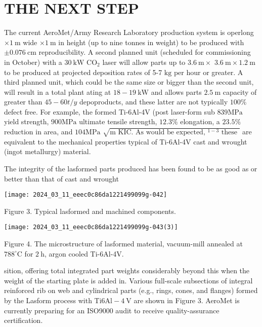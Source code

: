 \documentclass[10pt]{article}
\begin{document}
\section*{THE NEXT STEP}
The current AeroMet/Army Research Laboratory production system is operlong $\times 1 \mathrm{~m}$ wide $\times 1 \mathrm{~m}$ in height (up to nine tonnes in weight) to be produced with $\pm 0.076 \mathrm{~cm}$ reproducibility. A second planned unit (scheduled for commissioning in October) with a $30 \mathrm{~kW}$ $\mathrm{CO}_{2}$ laser will allow parts up to $3.6 \mathrm{~m} \times$ $3.6 \mathrm{~m} \times 1.2 \mathrm{~m}$ to be produced at projected deposition rates of 5-7 $\mathrm{kg}$ per hour or greater. A third planned unit, which could be the same size or bigger than the second unit, will result in a total plant ating at $18-19 \mathrm{~kW}$ and allows parts $2.5 \mathrm{~m}$ capacity of greater than $45-60 t / y$ depoproducts, and these latter are not typically $100 \%$ defect free. For example, the formed Ti-6Al-4V (post laser-form sub $839 \mathrm{MPa}$ yield strength, $900 \mathrm{MPa}$ ultimate tensile strength, $12.3 \%$ elongation, a $23.5 \%$ reduction in area, and $104 \mathrm{MPa}$ $\sqrt{\mathrm{m} \text { KIC. As would be expected, }{ }^{1-3} \text { these }}$ are equivalent to the mechanical properties typical of Ti-6Al-4V cast and wrought (ingot metallurgy) material.

The integrity of the lasformed parts produced has been found to be as good as or better than that of cast and wrought

\begin{center}
\texttt{[image: 2024\_03\_11\_eeec0c86da1221499099g-042]}
\end{center}

Figure 3. Typical lasformed and machined components.

\begin{center}
\texttt{[image: 2024\_03\_11\_eeec0c86da1221499099g-043(3)]}
\end{center}

Figure 4. The microstructure of lasformed material, vacuum-mill annealed at $788^{\circ} \mathrm{C}$ for $2 \mathrm{~h}$, argon cooled Ti-6Al-4V.

sition, offering total integrated part weights considerably beyond this when the weight of the starting plate is added in. Various full-scale subsections of integral reinforced rib on web and cylindrical parts (e.g., rings, cones, and flanges) formed by the Lasform process with Ti$6 \mathrm{Al}-4 \mathrm{~V}$ are shown in Figure 3. AeroMet is currently preparing for an ISO9000 audit to receive quality-assurance certification.
\end{document}
